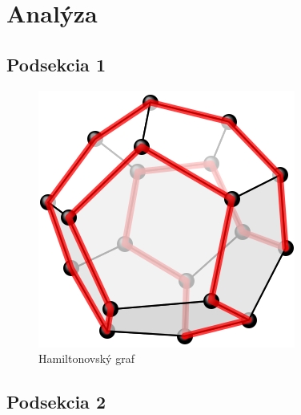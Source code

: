 \chapter{Analýza}
\par \lipsum[3]
\cite{coplienAOSDObjects}

\section{Podsekcia 1}

\begin{figure}[h!]
    \centering
    \includegraphics[width=\columnwidth]{assets/images/Hamiltonian_path_3d}
    \caption{Hamiltonovský graf}
    \label{fig:hamiltonian}
    \vspace{0.5cm}
\end{figure}

\par \lipsum[8]
\cite{opensourceArch}

\section{Podsekcia 2}
\par \lipsum[6]
\cite{coplienGOTODCI, coplienOredevDCI}
\par \lipsum[5]
\cite{generativeProg}